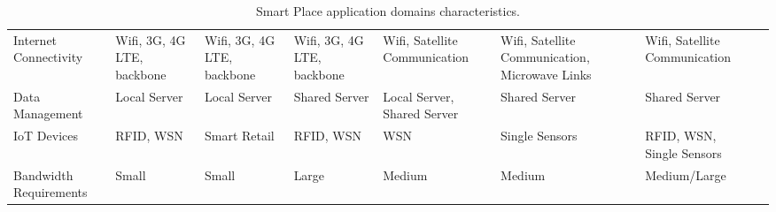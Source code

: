 \begin{landscape}
\begin{table}[p]
\begin{adjustbox}{width=\textwidth}
\begin{tabular}{*{14}{l}}
      Internet Connectivity  & \multicolumn{2}{p{\colWidth}}{\raggedright Wifi, 3G, 4G LTE, backbone} & \multicolumn{2}{p{\colWidth}}{\raggedright Wifi, 3G, 4G LTE, backbone} & \multicolumn{2}{p{\colWidth}}{\raggedright Wifi, 3G, 4G LTE, backbone}              & \multicolumn{2}{p{\colWidth}}{\raggedright Wifi, Satellite Communication}     & \multicolumn{2}{p{\colWidth}}{\raggedright Wifi, Satellite Communication, Microwave Links}   & \multicolumn{2}{p{\colWidth}}{\raggedright Wifi, Satellite Communication}            \\
      Data Management        & \multicolumn{2}{p{\colWidth}}{\raggedright Local Server}               & \multicolumn{2}{p{\colWidth}}{\raggedright Local Server}               & \multicolumn{2}{p{\colWidth}}{\raggedright Shared Server}                           & \multicolumn{2}{p{\colWidth}}{\raggedright Local Server, Shared Server}       & \multicolumn{2}{p{\colWidth}}{\raggedright Shared Server}                                    & \multicolumn{2}{p{\colWidth}}{\raggedright Shared Server}                            \\
      IoT Devices            & \multicolumn{2}{p{\colWidth}}{\raggedright RFID, WSN}                  & \multicolumn{2}{p{\colWidth}}{\raggedright Smart Retail}               & \multicolumn{2}{p{\colWidth}}{\raggedright RFID, WSN}                               & \multicolumn{2}{p{\colWidth}}{\raggedright WSN}                               & \multicolumn{2}{p{\colWidth}}{\raggedright Single Sensors}                                   & \multicolumn{2}{p{\colWidth}}{\raggedright RFID, WSN, Single Sensors}                \\
      Bandwidth Requirements & \multicolumn{2}{p{\colWidth}}{\raggedright Small}                      & \multicolumn{2}{p{\colWidth}}{\raggedright Small}                      & \multicolumn{2}{p{\colWidth}}{\raggedright Large}                                   & \multicolumn{2}{p{\colWidth}}{\raggedright Medium}                            & \multicolumn{2}{p{\colWidth}}{\raggedright Medium}                                           & \multicolumn{2}{p{\colWidth}}{\raggedright Medium/Large}                             \\
      \bottomrule
      \end{tabular}
    \end{adjustbox}
    \caption{Smart Place application domains characteristics.}
    \label{table:smart_places_characteristics}
  \end{table}
\end{landscape}
